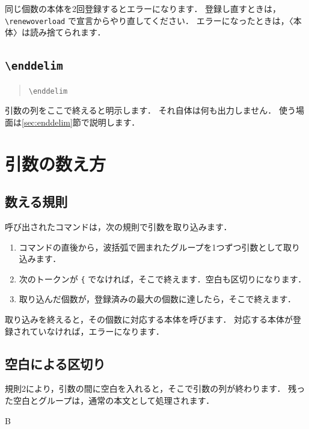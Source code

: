 \documentclass[lualatex,ja = standard,a4paper,11pt]{bxjsarticle}
\newcommand\cs[1]{\texttt{\textbackslash #1}}
\begin{document}
同じ個数の本体を2回登録するとエラーになります．
登録し直すときは，\verb|\renewoverload| で宣言からやり直してください．
エラーになったときは，〈本体〉は読み捨てられます．

\subsection{\texttt{\textbackslash enddelim}}

\begin{quote}
\cs{enddelim}
\end{quote}

引数の列をここで終えると明示します．
それ自体は何も出力しません．
使う場面は\ref{sec:enddelim}節で説明します．

\section{引数の数え方}\label{sec:counting}

\subsection{数える規則}

呼び出されたコマンドは，次の規則で引数を取り込みます．

\begin{enumerate}
\item コマンドの直後から，波括弧で囲まれたグループを1つずつ引数として取り込みます．
\item 次のトークンが \verb|{| でなければ，そこで終えます．空白も区切りになります．
\item 取り込んだ個数が，登録済みの最大の個数に達したら，そこで終えます．
\end{enumerate}

取り込みを終えると，その個数に対応する本体を呼びます．
対応する本体が登録されていなければ，エラーになります．

\subsection{空白による区切り}

規則2により，引数の間に空白を入れると，そこで引数の列が終わります．
残った空白とグループは，通常の本文として処理されます．

\begin{example}
\newoverload{\hoge}


 {B}
\end{example}
\end{document}
